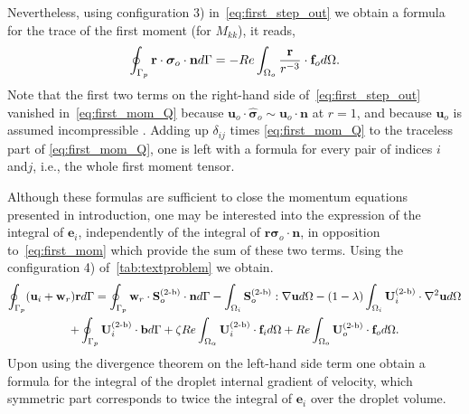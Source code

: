 Nevertheless, using configuration 3) in~\ref{eq:first_step_out} we obtain a formula for the trace of the first moment (for $M_{kk}$), it reads, 
\begin{equation}
    \intS[p]{\textbf{r} \cdot  \bm\sigma_{o}\cdot \textbf{n}}
    =
    - 
    Re\intO[o]{\frac{\textbf{r}}{r^{-3}}\cdot \textbf{f}_{o}}. 
    \label{eq:first_mom_Q}
\end{equation}
Note that the first two terms on the right-hand side of~\ref{eq:first_step_out} vanished in~\ref{eq:first_mom_Q} because $\textbf{u}_o\cdot \hat{\bm\sigma}_o  \sim \textbf{u}_o \cdot \textbf{n}$ at $r=1$, and because $\textbf{u}_o$ is assumed incompressible \citep{stone2001inertial}. 
Adding up $\delta_{ij}$ times \ref{eq:first_mom_Q} to the traceless part of \ref{eq:first_mom_Q}, one is left with a formula for every pair of indices $i$ and$j$, i.e., the whole first moment tensor. 


Although these formulas are sufficient to close the momentum equations presented in introduction, one may be interested into the expression of the integral of $\textbf{e}_i$, independently of the integral of  $\textbf{r}\bm\sigma_o\cdot \textbf{n}$, in opposition to~\ref{eq:first_mom} which provide the sum of these two terms. 
Using the configuration 4) of~\ref{tab:textproblem} we obtain. 
\begin{multline}
    \intS[p]{(\textbf{u}_{i} + \textbf{w}_r)\textbf{r}}
    =
    \intS[p]{\textbf{w}_{r}\cdot \textbf{S}_{o}^\text{(2-b)}\cdot \textbf{n}}
    - \intO[i]{\textbf{S}_{o}^\text{(2-b)} :\grad\textbf{u}}
    - (1-\lambda) \intO[i]{\textbf{U}_{i}^\text{(2-b)} \cdot \grad^2 \textbf{u} }\\ 
    + \intS[p]{\textbf{U}_{i}^\text{(2-b)} \cdot  \textbf{b}}
    + \zeta Re \intO{\textbf{U}_{i}^\text{(2-b)}\cdot \textbf{f}_{i}} 
    + Re\intO[o]{\textbf{U}_{o}^\text{(2-b)}\cdot \textbf{f}_{o}}.
    \label{eq:internal_e}
\end{multline}
Upon using the divergence theorem on the left-hand side term one obtain a formula for the integral of the droplet internal gradient of velocity, which symmetric part corresponds to twice the integral of $\textbf{e}_i$ over the droplet volume. 

